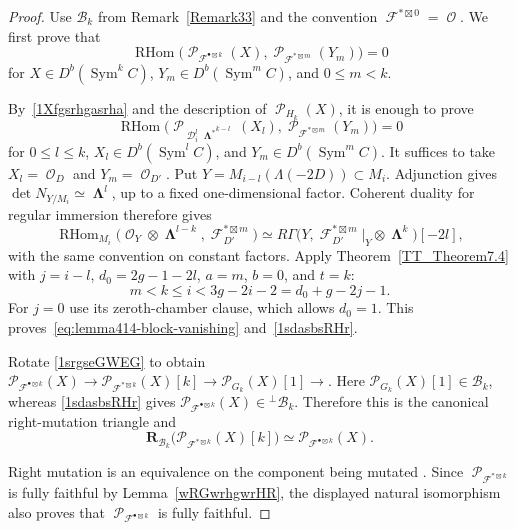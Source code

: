 \documentclass[11pt,letterpaper]{amsart}
\theoremstyle{plain}
\theoremstyle{definition}
\theoremstyle{remark}
\numberwithin{equation}{section}
\DeclareMathOperator{\RHom}{RHom}
\DeclareMathOperator{\Sym}{Sym}
\DeclareMathOperator{\cD}{\mathcal{D}}
\DeclareMathOperator{\cF}{\mathcal{F}}
\DeclareMathOperator{\cO}{\mathcal{O}}
\DeclareMathOperator{\cP}{\mathcal{P}}
\DeclareMathOperator{\bLambda}{{\boldsymbol\Lambda}}
\begin{document}
\begin{proof}
Use $\mathcal B_k$ from Remark~\ref{Remark33} and the convention \(\cF^{*\boxtimes0}=\cO\). We first prove that
\begin{equation}\label{1sdasbsRHr}
\RHom\bigl(
\cP_{\cF^{\bullet\boxtimes k}}(X),
\cP_{\cF^{*\boxtimes m}}(Y_m)
\bigr)=0
\end{equation}
for \(X\in D^b(\Sym^kC)\), \(Y_m\in D^b(\Sym^mC)\), and
\(0\le m<k\).

By~\eqref{1Xfgsrhgasrha} and the description of \(\cP_{H_k}(X)\), it is
enough to prove
\begin{equation}\label{eq:lemma414-block-vanishing}
\RHom\bigl(
\cP_{\cD_i^l{\bLambda^*}^{k-l}}(X_l),
\cP_{\cF^{*\boxtimes m}}(Y_m)
\bigr)=0
\end{equation}
for \(0\le l\le k\), \(X_l\in D^b(\Sym^lC)\), and
\(Y_m\in D^b(\Sym^mC)\). 
It suffices to take $X_l=\cO_D$ and $Y_m=\cO_{D'}$.
Put $Y=M_{i-l}(\Lambda(-2D))\subset M_i$. Adjunction gives
$\det N_{Y/M_i}\simeq\bLambda^l$, up to a fixed one-dimensional
factor. Coherent duality for regular immersion therefore gives
\[
 \RHom_{M_i}\bigl(\cO_Y\otimes\bLambda^{l-k},
                         \cF_{D'}^{*\boxtimes m}\bigr)
 \simeq
 R\Gamma\bigl(Y,\cF_{D'}^{*\boxtimes m}|_Y
                    \otimes\bLambda^k\bigr)[-2l],
\]
with the same convention on constant factors.
Apply Theorem~\ref{TT_Theorem7.4} with
$j=i-l$, $d_0=2g-1-2l$, $a=m$, $b=0$, and $t=k$:
\[
 m<k\le i<3g-2i-2=d_0+g-2j-1.
\]
For $j=0$ use its zeroth-chamber clause, which allows $d_0=1$.
This proves~\eqref{eq:lemma414-block-vanishing}
and~\eqref{1sdasbsRHr}.


 Rotate \eqref{1srgseGWEG} to obtain
$
 \mathcal P_{\mathcal F^{\bullet\boxtimes k}}(X)
 \longrightarrow
 \mathcal P_{\mathcal F^{*\boxtimes k}}(X)[k]
 \longrightarrow
 \mathcal P_{G_k}(X)[1]
 \longrightarrow
$.
Here $\mathcal P_{G_k}(X)[1]\in\mathcal B_k$, whereas
\eqref{1sdasbsRHr} gives
$\mathcal P_{\mathcal F^{\bullet\boxtimes k}}(X)
 \in{}^\perp\mathcal B_k$.  Therefore this is the canonical
right-mutation triangle and
\[
 \mathbf R_{\mathcal B_k}
 \bigl(\mathcal P_{\mathcal F^{*\boxtimes k}}(X)[k]\bigr)
 \simeq
 \mathcal P_{\mathcal F^{\bullet\boxtimes k}}(X).
\]

Right mutation is an equivalence on the component being mutated
\cite[Theorem~2.10]{KuzHH}. Since $\cP_{\cF^{*\boxtimes k}}$ is fully
faithful by Lemma~\ref{wRGwrhgwrHR}, the displayed natural isomorphism
also proves that $\cP_{\cF^{\bullet\boxtimes k}}$ is fully faithful.
\end{proof}
\end{document}
